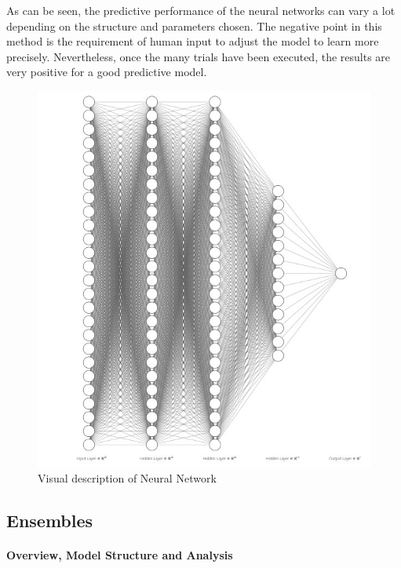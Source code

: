 \documentclass[
  paper=a4,
  ,captions=tableheading
]{scrartcl}
\begin{document}
As can be seen, the predictive performance of the neural networks can
vary a lot depending on the structure and parameters chosen. The
negative point in this method is the requirement of human input to
adjust the model to learn more precisely. Nevertheless, once the many
trials have been executed, the results are very positive for a good
predictive model.

\begin{figure}
\centering
\includegraphics{NN_rep.jpeg}
\caption{Visual description of Neural Network}
\end{figure}

\hypertarget{ensembles}{%
\subsection{Ensembles}\label{ensembles}}

\hypertarget{overview-model-structure-and-analysis}{%
\paragraph{Overview, Model Structure and
Analysis}\label{overview-model-structure-and-analysis}}
\end{document}
